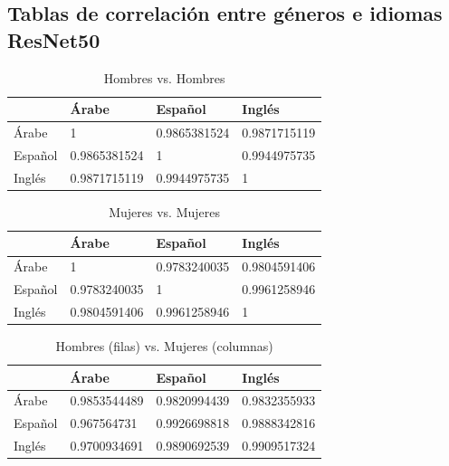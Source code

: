 \documentclass[runningheads]{llncs}
\begin{document}
\subsection{Tablas de correlación entre géneros e idiomas ResNet50}

\begin{table}[!h]
\centering
\caption{Hombres vs. Hombres}
\label{male-vs-male-correlation-resnet}
\begin{tabular}{|l|l|l|l|}
\hline
      & Árabe & Español & Inglés \\ \hline
Árabe & 1 & 0.9865381524 & 0.9871715119 \\ \hline
Español & 0.9865381524 & 1 & 0.9944975735 \\ \hline
Inglés & 0.9871715119 & 0.9944975735 &	1 \\ \hline
\end{tabular}
\end{table}


\begin{table}[!h]
\centering
\caption{Mujeres vs. Mujeres}
\label{female-vs-female-correlation-resnet}
\begin{tabular}{|l|l|l|l|}
\hline
& Árabe & Español & Inglés \\ \hline
Árabe & 1 & 0.9783240035 & 0.9804591406 \\ \hline
Español & 0.9783240035 & 1 & 0.9961258946 \\ \hline
Inglés & 0.9804591406 & 0.9961258946 & 1 \\ \hline
\end{tabular}
\end{table}



\begin{table}[!h]

\centering
\caption{Hombres (filas) vs. Mujeres (columnas)}
\label{female-vs-male-correlation-resnet}
\begin{tabular}{|l|l|l|l|}
\hline
 & Árabe & Español & Inglés \\ \hline
Árabe & 0.9853544489 & 0.9820994439 & 0.9832355933 \\ \hline
Español & 0.967564731 & 0.9926698818 & 0.9888342816 \\ \hline
Inglés & 0.9700934691 & 0.9890692539 & 0.9909517324 \\ \hline

\end{tabular}
\end{table}
\end{document}

